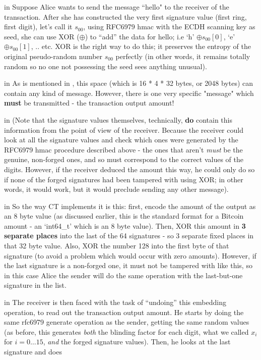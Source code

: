 \documentclass[10pt,a4paper]{article}
\begin{document}
 in \noindent Suppose Alice wants to send the message ``hello" to the receiver of the transaction. After she has constructed the very first signature value (first ring, first digit), let's call it $s_{00}$, using RFC6979 hmac with the ECDH scanning key as seed, she can use XOR ($\oplus$) to ``add'' the data for hello; i.e `h' $\oplus s_{00}[0]$, `e' $\oplus s_{00}[1]$, .. etc. XOR is the right way to do this; it preserves the entropy of the original pseudo-random number $s_{00}$ perfectly (in other words, it remains totally random so no one not possessing the seed sees anything unusual).

 in \noindent As is mentioned in \cite{ct_wu}, this space (which is 16 * 4 * 32 bytes, or 2048 bytes) can contain any kind of message. However, there is one very specific "message" which \textbf{must} be transmitted - the transaction output amount!

 in \noindent (Note that the signature values themselves, technically, \textbf{do} contain this information from the point of view of the receiver. Because the receiver could look at all the signature values and check which ones were generated by the RFC6979 hmac procedure described above - the ones that aren't \textit{must} be the genuine, non-forged ones, and so must correspond to the correct values of the digits. However, if the receiver deduced the amount this way, he could only do so if none of the forged signatures had been tampered with using XOR; in other words, it would work, but it would preclude sending any other message).

 in \noindent So the way CT implements it is this: first, encode the amount of the output as an 8 byte value (as discussed earlier, this is the standard format for a Bitcoin amount - an `int64\_t' which is an 8 byte value). Then, XOR this amount in \textbf{3 separate places} into the last of the 64 signatures - so 3 separate fixed places in that 32 byte value. Also, XOR the number 128 into the first byte of that signature (to avoid a problem which would occur with zero amounts). However, if the last signature is a non-forged one, it must not be tampered with like this, so in this case Alice the sender will do the same operation with the last-but-one signature in the list.

 in \noindent The receiver is then faced with the task of ``undoing'' this embedding operation, to read out the transaction output amount. He starts by doing the same rfc6979 generate operation as the sender, getting the same random values (as before, this generates \textit{both} the blinding factor for each digit, what we called $x_{i}$ for $i=0 \ldots 15$, \textit{and} the forged signature values). Then, he looks at the last signature and does
\end{document}
